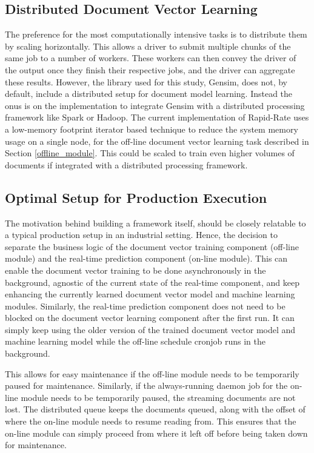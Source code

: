 \documentclass[conference]{IEEEtran}
\begin{document}
    \subsection{Distributed Document Vector Learning} \label{dist_docvec_learning}
        The preference for the most computationally intensive tasks is to distribute them by scaling horizontally.
        This allows a driver to submit multiple chunks of the same job to a number of workers.
        These workers can then convey the driver of the output once they finish their respective jobs, and the driver can aggregate these results.
        However, the library used for this study, Gensim, does not, by default, include a distributed setup for document model learning.
        Instead the onus is on the implementation to integrate Gensim with a distributed processing framework like Spark or Hadoop.
        The current implementation of Rapid-Rate uses a low-memory footprint iterator based technique to reduce the system memory usage on a single node, for the off-line document vector learning task described in Section \ref{offline_module}.
        This could be scaled to train even higher volumes of documents if integrated with a distributed processing framework.

    \subsection{Optimal Setup for Production Execution}
        The motivation behind building a framework itself, should be closely relatable to a typical production setup in an industrial setting.
        Hence, the decision to separate the business logic of the document vector training component (off-line module) and the real-time prediction component (on-line module). 
        This can enable the document vector training to be done asynchronously in the background, agnostic of the current state of the real-time component, and keep enhancing the currently learned document vector model and machine learning modules.
        Similarly, the real-time prediction component does not need to be blocked on the document vector learning component after the first run.
        It can simply keep using the older version of the trained document vector model and machine learning model while the off-line schedule cronjob runs in the background.

        This allows for easy maintenance if the off-line module needs to be temporarily paused for maintenance.
        Similarly, if the always-running daemon job for the on-line module needs to be temporarily paused, the streaming documents are not lost. 
        The distributed queue keeps the documents queued, along with the offset of where the on-line module needs to resume reading from. 
        This ensures that the on-line module can simply proceed from where it left off before being taken down for maintenance.
\end{document}
